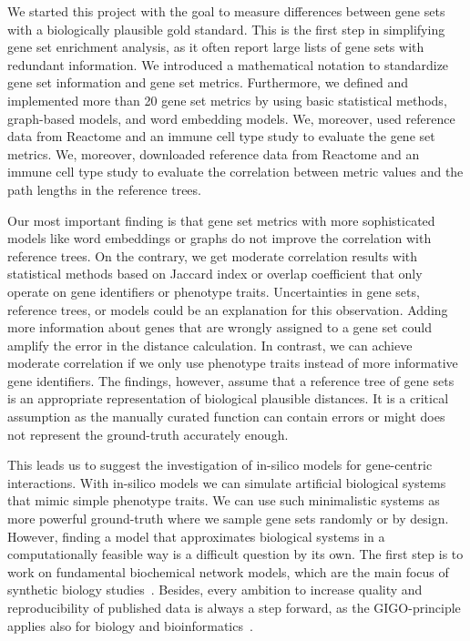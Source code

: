 \documentclass{thesisclass}
\begin{document}



We started this project with the goal to measure differences between gene sets with a biologically plausible gold standard. 
This is the first step in simplifying gene set enrichment analysis, as it often report large lists of gene sets with redundant information.
We introduced a mathematical notation to standardize gene set information and gene set metrics.
Furthermore, we defined and implemented more than 20 gene set metrics by using basic statistical methods, graph-based models, and word embedding models. 
We, moreover, used reference data from Reactome and an immune cell type study to evaluate the gene set metrics. 
We, moreover, downloaded reference data from Reactome and an immune cell type study to evaluate the correlation between metric values and the path lengths in the reference trees. 

Our most important finding is that gene set metrics with more sophisticated models like word embeddings or graphs do not improve the correlation with reference trees.
On the contrary, we get moderate correlation results with statistical methods based on Jaccard index or overlap coefficient that only operate on gene identifiers or phenotype traits. 
Uncertainties in gene sets, reference trees, or models could be an explanation for this observation. 
Adding more information about genes that are wrongly assigned to a gene set could amplify the error in the distance calculation. 
In contrast, we can achieve moderate correlation if we only use phenotype traits instead of more informative gene identifiers. 
The findings, however, assume that a reference tree of gene sets is an appropriate representation of biological plausible distances. 
It is a critical assumption as the manually curated function can contain errors or might does not represent the ground-truth accurately enough.

This leads us to suggest the investigation of in-silico models for gene-centric interactions. 
With in-silico models we can simulate artificial biological systems that mimic simple phenotype traits.
We can use such minimalistic systems as more powerful ground-truth where we sample gene sets randomly or by design.
However, finding a model that approximates biological systems in a computationally feasible way is a difficult question by its own.
The first step is to work on fundamental biochemical network models, which are the main focus of synthetic biology studies~\cite{doi:10.1093/bioinformatics/btg015}. Besides, every ambition to increase quality and reproducibility of published data is always a step forward, as the GIGO-principle applies also for biology and bioinformatics~\cite{Bininda-Emonds2004}.
\end{document}
